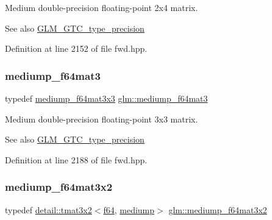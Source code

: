 Medium double-\/precision floating-\/point 2x4 matrix. \begin{DoxySeeAlso}{See also}
\hyperlink{group__gtc__type__precision}{G\+L\+M\+\_\+\+G\+T\+C\+\_\+type\+\_\+precision} 
\end{DoxySeeAlso}


Definition at line 2152 of file fwd.\+hpp.

\mbox{\label{group__gtc__type__precision_gae38a4a0b57e25d9cbb153dcaab9432ec}} 
\subsubsection{\texorpdfstring{mediump\+\_\+f64mat3}{mediump\_f64mat3}}
{\footnotesize\ttfamily typedef \hyperlink{group__gtc__type__precision_ga871b69a221dae7461aa746e6e6d372fc}{mediump\+\_\+f64mat3x3} \hyperlink{group__gtc__type__precision_gae38a4a0b57e25d9cbb153dcaab9432ec}{glm\+::mediump\+\_\+f64mat3}}

Medium double-\/precision floating-\/point 3x3 matrix. \begin{DoxySeeAlso}{See also}
\hyperlink{group__gtc__type__precision}{G\+L\+M\+\_\+\+G\+T\+C\+\_\+type\+\_\+precision} 
\end{DoxySeeAlso}


Definition at line 2188 of file fwd.\+hpp.

\mbox{\label{group__gtc__type__precision_gad6408472435fce994a3bb9d14d321ddd}} 
\subsubsection{\texorpdfstring{mediump\+\_\+f64mat3x2}{mediump\_f64mat3x2}}
{\footnotesize\ttfamily typedef \hyperlink{structglm_1_1detail_1_1tmat3x2}{detail\+::tmat3x2}$<$\hyperlink{group__gtc__type__precision_ga2bba392e555124b36cde6abba349bab3}{f64}, \hyperlink{namespaceglm_a0f04f086094c747d227af4425893f545a6416f3ea0c9025fb21ed50c4d6620482}{mediump}$>$ \hyperlink{group__gtc__type__precision_gad6408472435fce994a3bb9d14d321ddd}{glm\+::mediump\+\_\+f64mat3x2}}

